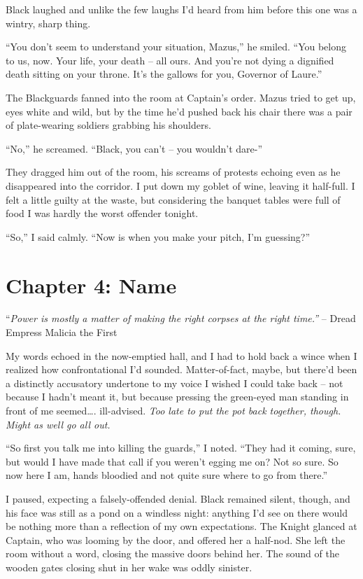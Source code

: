 \documentclass[12pt, openany]{book}
\begin{document}
Black laughed and unlike the few laughs I’d heard from him before this one was a wintry, sharp thing.

“You don’t seem to understand your situation, Mazus,” he smiled. “You belong to us, now. Your life, your death – all ours. And you’re not dying a dignified death sitting on your throne. It’s the gallows for you, Governor of Laure.”

The Blackguards fanned into the room at Captain’s order. Mazus tried to get up, eyes white and wild, but by the time he’d pushed back his chair there was a pair of plate-wearing soldiers grabbing his shoulders.

“No,” he screamed. “Black, you can’t – you wouldn’t dare-”

They dragged him out of the room, his screams of protests echoing even as he disappeared into the corridor. I put down my goblet of wine, leaving it half-full. I felt a little guilty at the waste, but considering the banquet tables were full of food I was hardly the worst offender tonight.

“So,” I said calmly. “Now is when you make your pitch, I’m guessing?”
\clearpage
\chapter{Chapter 4: Name}

“\textit{Power is mostly a matter of making the right corpses at the right time.”}
– Dread Empress Malicia the First

My words echoed in the now-emptied hall, and I had to hold back a wince when I realized how confrontational I’d sounded. Matter-of-fact, maybe, but there’d been a distinctly accusatory undertone to my voice I wished I could take back – not because I hadn’t meant it, but because pressing the green-eyed man standing in front of me seemed…. ill-advised. \textit{Too late to put the pot back together, though. Might as well go all out.}

“So first you talk me into killing the guards,” I noted. “They had it coming, sure, but would I have made that call if you weren’t egging me on? Not so sure. So now here I am, hands bloodied and not quite sure where to go from there.”

I paused, expecting a falsely-offended denial. Black remained silent, though, and his face was still as a pond on a windless night: anything I’d see on there would be nothing more than a reflection of my own expectations. The Knight glanced at Captain, who was looming by the door, and offered her a half-nod. She left the room without a word, closing the massive doors behind her. The sound of the wooden gates closing shut in her wake was oddly sinister.
\end{document}
